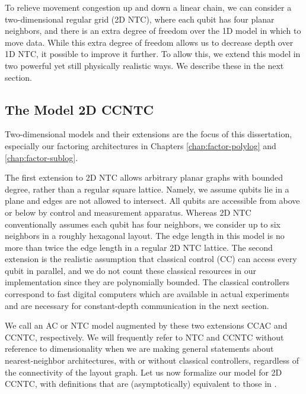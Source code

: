 To relieve movement congestion up and down a linear chain,
we can consider a two-dimensional regular grid
(\textsf{2D NTC}), where each
qubit has four planar neighbors, and 
there is an extra degree of freedom over the \textsc{1D} model
in which to move data. While this extra degree of freedom allows us to
decrease depth over \textsf{1D NTC}, it possible to improve it further.
To allow this, we extend this model in two powerful yet still physically
realistic ways. We describe these in the next section.

\subsection{The Model \textsf{2D CCNTC}}
\label{subsec:2dccntc}


Two-dimensional models and their
extensions are the focus of this dissertation,
especially our factoring architectures in Chapters \ref{chap:factor-polylog}
and \ref{chap:factor-sublog}.

The first extension to \textsf{2D NTC} allows arbitrary planar graphs
with bounded degree, rather than a regular square lattice.
Namely, we assume qubits lie in a plane and edges are not allowed to intersect.
All qubits are accessible from above
or below by control and measurement apparatus.
Whereas \textsf{2D NTC} conventionally assumes each qubit
has four neighbors, we consider up to six neighbors in a roughly hexagonal
layout. The edge length in this model is no more than twice the edge length
in a regular \textsf{2D NTC} lattice.
The second extension is the realistic assumption
that classical control (CC) can
access every qubit in parallel, and we do not count these classical
resources in our implementation since they are polynomially bounded. The
classical controllers
correspond to fast digital computers which are
available in actual experiments and are necessary for constant-depth
communication in the next section.

We call an \textsf{AC} or \textsf{NTC} model augmented by these two extensions
\textsf{CCAC} and \textsf{CCNTC}, respectively.
We will frequently refer to \textsf{NTC} and \textsf{CCNTC} without
reference to dimensionality when we are making general statements about
nearest-neighbor architectures, with or without classical controllers,
regardless of the connectivity of the layout graph.
Let us now formalize our model for \textsf{2D CCNTC},
with definitions that are (asymptotically) equivalent to those in 
\cite{Rosenbaum2012}.

